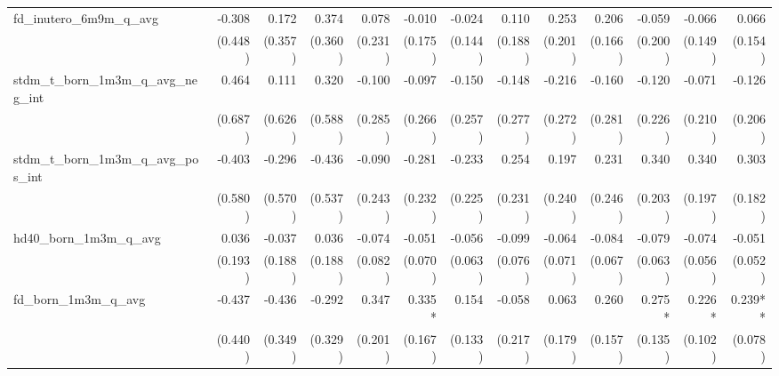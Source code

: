 \begin{tabular}{lrrrrrrrrrrrr}
fd\_inutero\_6m9m\_q\_avg                   &       -0.308 &        0.172 &        0.374 &        0.078 &       -0.010 &       -0.024 &        0.110 &        0.253 &        0.206 &       -0.059 &       -0.066 &        0.066 \\ 
                                            &      (0.448) &      (0.357) &      (0.360) &      (0.231) &      (0.175) &      (0.144) &      (0.188) &      (0.201) &      (0.166) &      (0.200) &      (0.149) &      (0.154) \\ 
stdm\_t\_born\_1m3m\_q\_avg\_neg\_int       &        0.464 &        0.111 &        0.320 &       -0.100 &       -0.097 &       -0.150 &       -0.148 &       -0.216 &       -0.160 &       -0.120 &       -0.071 &       -0.126 \\ 
                                            &      (0.687) &      (0.626) &      (0.588) &      (0.285) &      (0.266) &      (0.257) &      (0.277) &      (0.272) &      (0.281) &      (0.226) &      (0.210) &      (0.206) \\ 
stdm\_t\_born\_1m3m\_q\_avg\_pos\_int       &       -0.403 &       -0.296 &       -0.436 &       -0.090 &       -0.281 &       -0.233 &        0.254 &        0.197 &        0.231 &        0.340 &        0.340 &        0.303 \\ 
                                            &      (0.580) &      (0.570) &      (0.537) &      (0.243) &      (0.232) &      (0.225) &      (0.231) &      (0.240) &      (0.246) &      (0.203) &      (0.197) &      (0.182) \\ 
hd40\_born\_1m3m\_q\_avg                    &        0.036 &       -0.037 &        0.036 &       -0.074 &       -0.051 &       -0.056 &       -0.099 &       -0.064 &       -0.084 &       -0.079 &       -0.074 &       -0.051 \\ 
                                            &      (0.193) &      (0.188) &      (0.188) &      (0.082) &      (0.070) &      (0.063) &      (0.076) &      (0.071) &      (0.067) &      (0.063) &      (0.056) &      (0.052) \\ 
fd\_born\_1m3m\_q\_avg                      &       -0.437 &       -0.436 &       -0.292 &        0.347 &       0.335* &        0.154 &       -0.058 &        0.063 &        0.260 &       0.275* &       0.226* &      0.239** \\ 
                                            &      (0.440) &      (0.349) &      (0.329) &      (0.201) &      (0.167) &      (0.133) &      (0.217) &      (0.179) &      (0.157) &      (0.135) &      (0.102) &      (0.078) \\ 

\end{tabular}
